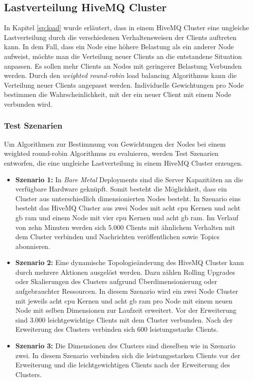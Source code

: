 \subsection{Lastverteilung HiveMQ Cluster} \label{ss:load-distribution}
In Kapitel \ref{sp:load} wurde erläutert, dass in einem HiveMQ Cluster eine ungleiche Lastverteilung durch die verschiedenen Verhaltensweisen der Clients auftreten kann.
In dem Fall, dass ein Node eine höhere Belastung als ein anderer Node aufweist, möchte man die Verteilung neuer Clients an die entstandene Situation anpassen. Es sollen mehr Clients an Nodes mit geringerer Belastung Verbunden werden.
Durch den \textit{weighted round-robin} load balancing Algorithmus kann die Verteilung neuer Clients angepasst werden. Individuelle Gewichtungen pro Node bestimmen die Wahrscheinlichkeit, mit der ein neuer Client mit einem Node verbunden wird.

\subsubsection{Test Szenarien} \label{ss:test}
Um Algorithmen zur Bestimmung von Gewichtungen der Nodes bei einem weighted round-robin Algorithmus zu evaluieren, werden Test Szenarien entworfen, die eine ungleiche Lastverteilung in einem HiveMQ Cluster erzeugen.

\begin{itemize}
  \item \textbf{Szenario 1:} In \textit{Bare Metal} Deployments sind die Server Kapazitäten an die verfügbare Hardware geknüpft. Somit besteht die Möglichkeit, dass ein Cluster aus unterschiedlich dimensionierten Nodes besteht. In Szenario eins besteht das HiveMQ Cluster aus zwei Nodes mit acht \ac{cpu} Kernen und acht \ac{gb} \ac{ram} und einem Node mit vier \ac{cpu} Kernen und acht \ac{gb} \ac{ram}. Im Verlauf von zehn Minuten werden sich 5.000 Clients mit ähnlichem Verhalten mit dem Cluster verbinden und Nachrichten veröffentlichen sowie Topics abonnieren.
  \item \textbf{Szenario 2:} Eine dynamische Topologieänderung des HiveMQ Cluster kann durch mehrere Aktionen ausgelöst werden. Dazu zählen Rolling Upgrades oder Skalierungen des Clusters aufgrund Überdimensionierung oder aufgebrauchter Ressourcen. In diesem Szenario wird ein zwei Node Cluster mit jeweils acht \ac{cpu} Kernen und acht \ac{gb} \ac{ram} pro Node mit einem neuen Node mit selben Dimensionen zur Laufzeit erweitert. Vor der Erweiterung sind 3.000 leichtgewichtige Clients mit dem Cluster verbunden. Nach der Erweiterung des Clusters verbinden sich 600 leistungsstarke Clients.
  \item \textbf{Szenario 3:} Die Dimensionen des Clusters sind dieselben wie in Szenario zwei. In diesem Szenario verbinden sich die leistungsstarken Clients vor der Erweiterung und die leichtgewichtigen Clients nach der Erweiterung des Clusters.
\end{itemize}

